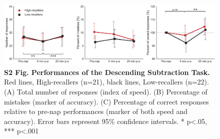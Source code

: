 \begin{figure}[!htbp]
	\includegraphics[width=\textwidth]{Fig/Results/Inertia/DRF/S2_Fig.png}
	\caption*{\textbf{S2 Fig. Performances of the Descending Subtraction Task.} Red lines, High-recallers (n=21), black lines, Low-recallers (n=22). (A) Total number of responses (index of speed). (B) Percentage of mistakes (marker of accuracy). (C) Percentage of correct responses relative to pre-nap performances (marker of both speed and accuracy). Error bars represent 95\% confidence intervals. * p<.05, *** p<.001}
\end{figure}
